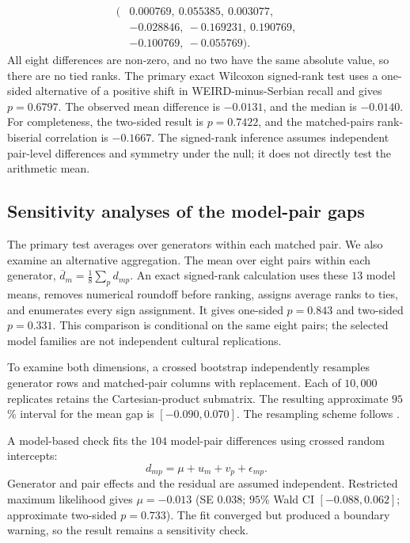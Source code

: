 \documentclass[11pt,a4paper]{article}
\begin{document}
\[
\begin{aligned}
(&0.000769,\ 0.055385,\ 0.003077,\\
 &-0.028846,\ -0.169231,\ 0.190769,\\
 &-0.100769,\ -0.055769).
\end{aligned}
\]
All eight differences are non-zero, and no two have the same absolute value, so there are no tied ranks. The primary exact Wilcoxon signed-rank test uses a one-sided alternative of a positive shift in WEIRD-minus-Serbian recall and gives $p=0.6797$. The observed mean difference is $-0.0131$, and the median is $-0.0140$. For completeness, the two-sided result is $p=0.7422$, and the matched-pairs rank-biserial correlation is $-0.1667$. The signed-rank inference assumes independent pair-level differences and symmetry under the null; it does not directly test the arithmetic mean.

\subsection{Sensitivity analyses of the model-pair gaps}
\label{app:gap-sensitivity}
The primary test averages over generators within each matched pair. We also examine an alternative aggregation. The mean over eight pairs within each generator, $\overline d_m=\frac18\sum_p d_{mp}$. An exact signed-rank calculation uses these $13$ model means, removes numerical roundoff before ranking, assigns average ranks to ties, and enumerates every sign assignment. It gives one-sided $p=0.843$ and two-sided $p=0.331$. This comparison is conditional on the same eight pairs; the selected model families are not independent cultural replications.

To examine both dimensions, a crossed bootstrap independently resamples generator rows and matched-pair columns with replacement. Each of $10{,}000$ replicates retains the Cartesian-product submatrix. The resulting approximate $95$\% interval for the mean gap is $[-0.090,0.070]$. The resampling scheme follows \citet{owenPigeonholeBootstrap2007}.

A model-based check fits the $104$ model-pair differences using crossed random intercepts:
\begin{equation}
d_{mp}=\mu+u_m+v_p+\epsilon_{mp}.
\label{eq:crossed}
\end{equation}
Generator and pair effects and the residual are assumed independent. Restricted maximum likelihood gives $\mu=-0.013$ (SE $0.038$; $95$\% Wald CI $[-0.088,0.062]$; approximate two-sided $p=0.733$). The fit converged but produced a boundary warning, so the result remains a sensitivity check.
\end{document}
